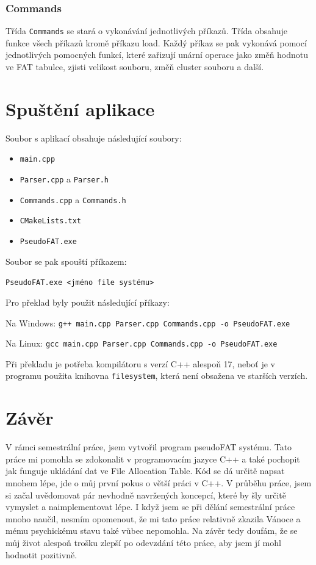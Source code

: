 \documentclass[12pt, a4paper]{article}
\begin{document}
        \subsubsection{Commands}
            Třída \texttt{Commands} se stará o vykonávání jednotlivých příkazů. Třída obsahuje funkce všech příkazů kromě příkazu load. Každý příkaz se pak vykonává pomocí jednotlivých pomocných funkcí, které zařizují unární operace jako změň hodnotu ve FAT tabulce, zjisti velikost souboru, změň cluster souboru a další.

\section{Spuštění aplikace}

    Soubor s aplikací obsahuje následující soubory:

    \begin{itemize}
        \item \texttt{main.cpp}
        \item \texttt{Parser.cpp} a \texttt{Parser.h}
        \item \texttt{Commands.cpp} a \texttt{Commands.h}
        \item \texttt{CMakeLists.txt}
        \item \texttt{PseudoFAT.exe}
    \end{itemize}

    Soubor se pak spouští příkazem:

    \vspace{0.5cm}
    \centerline{ \texttt{PseudoFAT.exe \textless jméno file systému\textgreater }} 
    \vspace{0.5cm}

    Pro překlad byly použit následující příkazy:

    \vspace{0.5cm}
    \centerline{Na Windows: \texttt{g++ main.cpp Parser.cpp Commands.cpp -o PseudoFAT.exe}} 
    \vspace{0.5cm}
    \centerline{Na Linux: \texttt{gcc main.cpp Parser.cpp Commands.cpp -o PseudoFAT.exe}} 
    \vspace{0.5cm}

    \noindent Při překladu je potřeba kompilátoru s verzí C++ alespoň 17, neboť je v programu použita knihovna \texttt{filesystem}, která není obsažena ve starších verzích.

\section{Závěr}
V rámci semestrální práce, jsem vytvořil program pseudoFAT systému. Tato práce mi pomohla se zdokonalit v programovacím jazyce C++ a také pochopit jak funguje ukládání dat ve File Allocation Table. Kód se dá určitě napsat mnohem lépe, jde o můj první pokus o větší práci v C++. V průběhu práce, jsem si začal uvědomovat pár nevhodně navržených koncepcí, které by šly určitě vymyslet a naimplementovat lépe. I když jsem se při dělání semestrální práce mnoho naučil, nesmím opomenout, že mi tato práce relativně zkazila Vánoce a mému psychickému stavu také vůbec nepomohla. Na závěr tedy doufám, že se můj život alespoň trošku zlepší po odevzdání této práce, aby jsem jí mohl hodnotit pozitivně.
\end{document}

